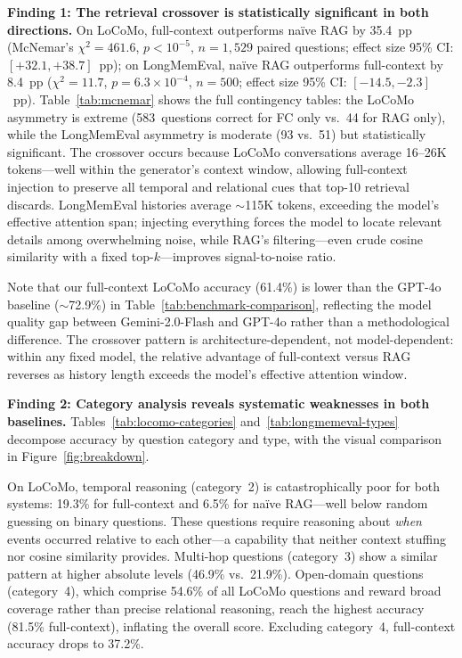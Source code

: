 \smallskip
\noindent\textbf{Finding 1: The retrieval crossover is statistically
significant in both directions.}\enspace
On LoCoMo, full-context outperforms na\"ive RAG by 35.4~pp
(McNemar's $\chi^2 = 461.6$, $p < 10^{-5}$, $n = 1{,}529$ paired questions;
effect size 95\% CI: $[+32.1, +38.7]$~pp);
on LongMemEval, na\"ive RAG outperforms full-context by 8.4~pp
($\chi^2 = 11.7$, $p = 6.3 \times 10^{-4}$, $n = 500$;
effect size 95\% CI: $[-14.5, -2.3]$~pp).
Table~\ref{tab:mcnemar} shows the full contingency tables: the LoCoMo
asymmetry is extreme (583~questions correct for FC only vs.\ 44 for RAG
only), while the LongMemEval asymmetry is moderate (93 vs.\ 51) but
statistically significant.  The crossover
occurs because LoCoMo conversations average 16--26K tokens---well within the
generator's context window, allowing full-context injection to preserve all
temporal and relational cues that top-10 retrieval discards.  LongMemEval
histories average ${\sim}$115K tokens, exceeding the model's effective
attention span; injecting everything forces the model to locate relevant
details among overwhelming noise, while RAG's filtering---even crude cosine
similarity with a fixed top-$k$---improves signal-to-noise ratio.

Note that our full-context LoCoMo accuracy (61.4\%) is lower than the GPT-4o
baseline (${\sim}$72.9\%) in Table~\ref{tab:benchmark-comparison}, reflecting
the model quality gap between Gemini-2.0-Flash and GPT-4o rather than a
methodological difference.  The crossover pattern is architecture-dependent,
not model-dependent: within any fixed model, the relative advantage of
full-context versus RAG reverses as history length exceeds the model's
effective attention window.

\smallskip
\noindent\textbf{Finding 2: Category analysis reveals systematic weaknesses
in both baselines.}\enspace
Tables~\ref{tab:locomo-categories} and~\ref{tab:longmemeval-types} decompose
accuracy by question category and type, with the visual comparison in
Figure~\ref{fig:breakdown}.

On LoCoMo, temporal reasoning (category~2) is catastrophically poor for both
systems: 19.3\% for full-context and 6.5\% for na\"ive RAG---well below
random guessing on binary questions.  These questions require reasoning about
\emph{when} events occurred relative to each other---a capability that
neither context stuffing nor cosine similarity provides.  Multi-hop questions
(category~3) show a similar pattern at higher absolute levels (46.9\% vs.\
21.9\%).  Open-domain questions (category~4), which comprise 54.6\% of all
LoCoMo questions and reward broad coverage rather than precise relational
reasoning, reach the highest accuracy (81.5\% full-context), inflating the
overall score.  Excluding category~4, full-context accuracy drops to 37.2\%.

